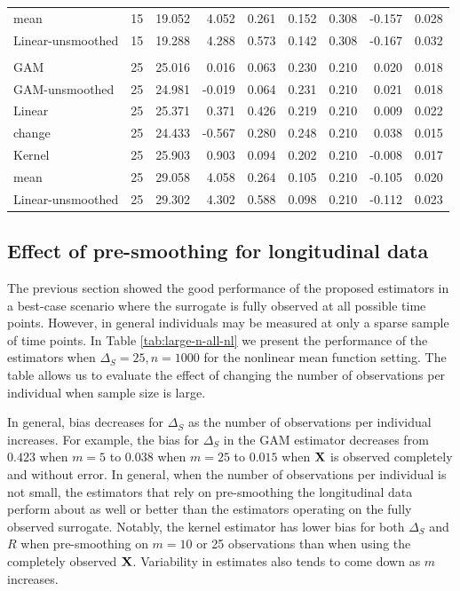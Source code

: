 \documentclass[useAMS,usenatbib,referee]{biom}
\begin{document}
\begin{table}[t]
\begin{tabular}{lrrrrrrrr}
\hspace{1em}mean & 15 & 19.052 & 4.052 & 0.261 & 0.152 & 0.308 & -0.157 & 0.028\\
\hspace{1em}Linear-unsmoothed & 15 & 19.288 & 4.288 & 0.573 & 0.142 & 0.308 & -0.167 & 0.032\\
\addlinespace[0.3em]
\multicolumn{9}{l}{\textbf{Large residual effect}}\\
\hspace{1em}GAM & 25 & 25.016 & 0.016 & 0.063 & 0.230 & 0.210 & 0.020 & 0.018\\
\hspace{1em}GAM-unsmoothed & 25 & 24.981 & -0.019 & 0.064 & 0.231 & 0.210 & 0.021 & 0.018\\
\hspace{1em}Linear & 25 & 25.371 & 0.371 & 0.426 & 0.219 & 0.210 & 0.009 & 0.022\\
\hspace{1em}change & 25 & 24.433 & -0.567 & 0.280 & 0.248 & 0.210 & 0.038 & 0.015\\
\hspace{1em}Kernel & 25 & 25.903 & 0.903 & 0.094 & 0.202 & 0.210 & -0.008 & 0.017\\
\hspace{1em}mean & 25 & 29.058 & 4.058 & 0.264 & 0.105 & 0.210 & -0.105 & 0.020\\
\hspace{1em}Linear-unsmoothed & 25 & 29.302 & 4.302 & 0.588 & 0.098 & 0.210 & -0.112 & 0.023\\
\bottomrule
\end{tabular}
\end{table}

\subsection{Effect of pre-smoothing for longitudinal data}
The previous section showed the good performance of the proposed estimators in a best-case scenario where the surrogate is fully observed at all possible time points. However, in general individuals may be measured at only a sparse sample of time points. In Table \ref{tab:large-n-all-nl} we present the performance of the estimators when $\Delta_S = 25, n = 1000$ for the nonlinear mean function setting. The table allows us to evaluate the effect of changing the number of observations per individual when sample size is large. 

In general, bias decreases for $\Delta_S$ as the number of observations per individual increases. For example, the bias for $\Delta_S$ in the GAM estimator decreases from $0.423$ when $m = 5$ to $0.038$ when $m = 25$ to $0.015$ when ${\bf X}$ is observed completely and without error. In general, when the number of observations per individual is not small, the estimators that rely on pre-smoothing the longitudinal data perform about as well or better than the estimators operating on the fully observed surrogate. Notably, the kernel estimator has lower bias for both $\Delta_S$ and $R$ when pre-smoothing on $m = 10$ or 25 observations than when using the completely observed ${\bf X}$. Variability in estimates also tends to come down as $m$ increases. 
\end{document}
